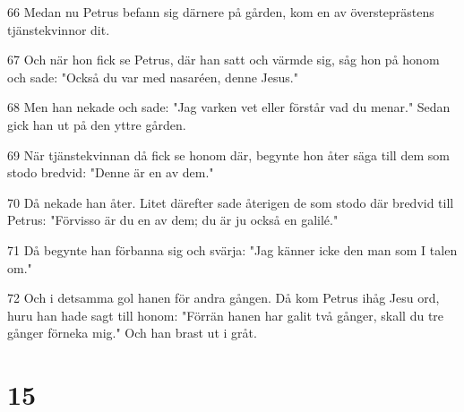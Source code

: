 \par 66 Medan nu Petrus befann sig därnere på gården, kom en av översteprästens tjänstekvinnor dit.
\par 67 Och när hon fick se Petrus, där han satt och värmde sig, såg hon på honom och sade: "Också du var med nasaréen, denne Jesus."
\par 68 Men han nekade och sade: "Jag varken vet eller förstår vad du menar." Sedan gick han ut på den yttre gården.
\par 69 När tjänstekvinnan då fick se honom där, begynte hon åter säga till dem som stodo bredvid: "Denne är en av dem."
\par 70 Då nekade han åter. Litet därefter sade återigen de som stodo där bredvid till Petrus: "Förvisso är du en av dem; du är ju också en galilé."
\par 71 Då begynte han förbanna sig och svärja: "Jag känner icke den man som I talen om."
\par 72 Och i detsamma gol hanen för andra gången. Då kom Petrus ihåg Jesu ord, huru han hade sagt till honom: "Förrän hanen har galit två gånger, skall du tre gånger förneka mig." Och han brast ut i gråt.

\chapter{15}


